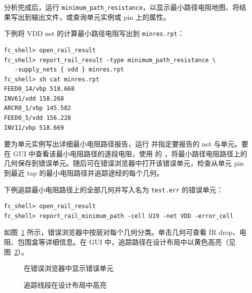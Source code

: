 分析完成后，运行   \texttt{minimum\_path\_resistance}，以显示最小路径电阻地图、将结果写出到输出文件，或查询单元实例或 pin 上的属性。

下例将 VDD net 的计算最小路径电阻写出到 \texttt{minres.rpt}：
\begin{lstlisting}
fc_shell> open_rail_result
fc_shell> report_rail_result -type minimum_path_resistance \
   -supply_nets { vdd } minres.rpt
fc_shell> sh cat minres.rpt
FEED0_14/vbp 518.668
INV61/vdd 158.268
ARCR0_1/vbp 145.582
FEED0_5/vdd 156.228
INV11/vbp 518.669
\end{lstlisting}

要为单元实例写出详细最小电阻路径报告，运行  并指定要报告的 net 与单元。要在 GUI 中查看该最小电阻路径的逐段电阻，使用  的 ，将最小路径电阻路径上的几何保存到错误单元。随后可在错误浏览器中打开该错误单元，检查从单元 pin 到最近 tap 的最小电阻路径并追踪途经的每个几何。

下例追踪最小电阻路径上的全部几何并写入名为 \texttt{test.err} 的错误单元：
\begin{lstlisting}
fc_shell> open_rail_result
fc_shell> report_rail_minimum_path -cell U19 -net VDD -error_cell
\end{lstlisting}

如图~\ref{fig:mpr-err} 所示，错误浏览器中按层对每个几何分类。单击几何可查看 IR drop、电阻、包围盒等详细信息。在 GUI 中，追踪路径在设计布局中以黄色高亮（见图~\ref{fig:mpr-trace}）。

\begin{figure}[htbp]
\centering
{}
\caption{在错误浏览器中显示错误单元}
\label{fig:mpr-err}
\end{figure}

\begin{figure}[htbp]
\centering
{}
\caption{追踪线段在设计布局中高亮}
\label{fig:mpr-trace}
\end{figure}

